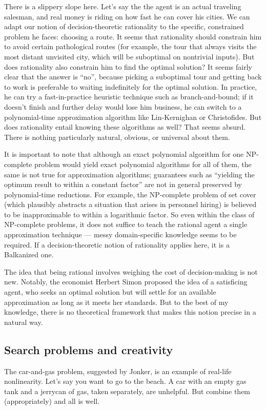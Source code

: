 \documentclass[letterpaper,12pt]{article}
\begin{document}
There is a slippery slope here. Let's say the the agent is an actual traveling salesman, and real money is riding on how fast he can cover his cities. We can adapt our notion of decision-theoretic rationality to the specific, constrained problem he faces: choosing a route. It seems that rationality should constrain him to avoid certain pathological routes (for example, the tour that always visits the most distant unvisited city, which will be suboptimal on nontrivial inputs). But does rationality also constrain him to find the optimal solution? It seems fairly clear that the answer is ``no'', because picking a suboptimal tour and getting back to work is preferable to waiting indefinitely for the optimal solution. In practice, he can try a fast-in-practice heuristic technique such as branch-and-bound; if it doesn't finish and further delay would lose him business, he can switch to a polynomial-time approximation algorithm like Lin-Kernighan or Christofides. But does rationality entail knowing these algorithms as well? That seems absurd. There is nothing particularly natural, obvious, or universal about them.

It is important to note that although an exact polynomial algorithm for one NP-complete problem would yield exact polynomial algorithms for all of them, the same is not true for approximation algorithms; guarantees such as ``yielding the optimum result to within a constant factor'' are not in general preserved by polynomial-time reductions. For example, the NP-complete problem of set cover (which plausibly abstracts a situation that arises in personnel hiring) is believed to be inapproximable to within a logarithmic factor. So even within the class of NP-complete problems, it does not suffice to teach the rational agent a single approximation technique --- messy domain-specific knowledge seems to be required. If a decision-theoretic notion of rationality applies here, it is a Balkanized one.

The idea that being rational involves weighing the cost of decision-making is not new. Notably, the economist Herbert Simon proposed the idea of a satisficing agent, who seeks an optimal solution but will settle for an available approximation as long as it meets her standards. But to the best of my knowledge, there is no theoretical framework that makes this notion precise in a natural way.

\subsection{Search problems and creativity}
The car-and-gas problem, suggested by Jonker, is an example of real-life nonlinearity. Let's say you want to go to the beach. A car with an empty gas tank and a jerrycan of gas, taken separately, are unhelpful. But combine them (appropriately) and all is well.
\end{document}

